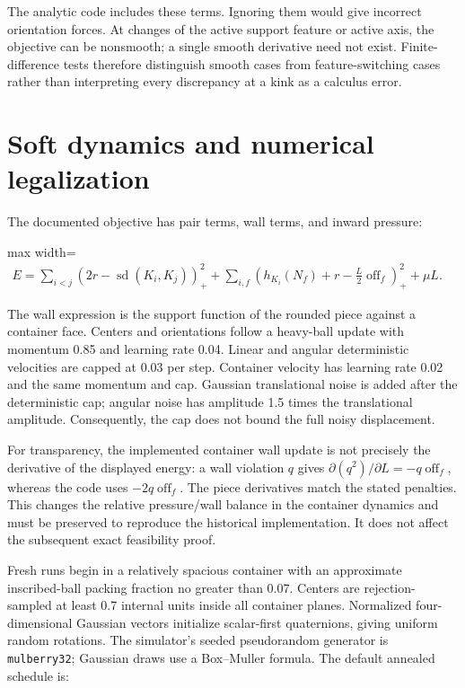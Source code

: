 \documentclass[11pt,a4paper]{article}
\begin{document}
The analytic code includes these terms. Ignoring them would give incorrect orientation forces. At changes of the active support feature or active axis, the objective can be nonsmooth; a single smooth derivative need not exist. Finite-difference tests therefore distinguish smooth cases from feature-switching cases rather than interpreting every discrepancy at a kink as a calculus error.

\section{Soft dynamics and numerical legalization}

The documented objective has pair terms, wall terms, and inward pressure:

\begin{center}\begin{adjustbox}{max width=\linewidth}$\displaystyle\begin{aligned}
E=\sum_{i<j}(2r-\operatorname{sd}(K_i,K_j))_+^2
+\sum_{i,f}\left(h_{K_i}(N_f)+r-\frac L2\operatorname{off}_f\right)_+^2
+\mu L.
\end{aligned}$\end{adjustbox}\end{center}

The wall expression is the support function of the rounded piece against a container face. Centers and orientations follow a heavy-ball update with momentum 0.85 and learning rate 0.04. Linear and angular deterministic velocities are capped at 0.03 per step. Container velocity has learning rate 0.02 and the same momentum and cap. Gaussian translational noise is added after the deterministic cap; angular noise has amplitude 1.5 times the translational amplitude. Consequently, the cap does not bound the full noisy displacement.

For transparency, the implemented container wall update is not precisely the derivative of the displayed energy: a wall violation \(q\) gives \(\partial(q^2)/\partial L=-q\operatorname{off}_f\), whereas the code uses \(-2q\operatorname{off}_f\). The piece derivatives match the stated penalties. This changes the relative pressure/wall balance in the container dynamics and must be preserved to reproduce the historical implementation. It does not affect the subsequent exact feasibility proof.

Fresh runs begin in a relatively spacious container with an approximate inscribed-ball packing fraction no greater than 0.07. Centers are rejection-sampled at least 0.7 internal units inside all container planes. Normalized four-dimensional Gaussian vectors initialize scalar-first quaternions, giving uniform random rotations. The simulator's seeded pseudorandom generator is \nolinkurl{mulberry32}; Gaussian draws use a Box--Muller formula. The default annealed schedule is:
\end{document}
